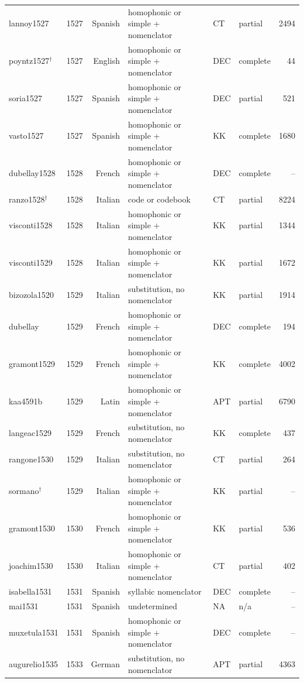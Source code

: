 {\begin{longtable}{@{}llrlllr@{}}
lannoy1527 & 1527 & Spanish & homophonic or simple + nomenclator & CT & partial & 2494 \\
poyntz1527$^\dagger$ & 1527 & English & homophonic or simple + nomenclator & DEC & complete & 44 \\
soria1527 & 1527 & Spanish & homophonic or simple + nomenclator & DEC & partial & 521 \\
vasto1527 & 1527 & Spanish & homophonic or simple + nomenclator & KK & complete & 1680 \\
dubellay1528 & 1528 & French & homophonic or simple + nomenclator & DEC & complete & -- \\
ranzo1528$^\dagger$ & 1528 & Italian & code or codebook & CT & partial & 8224 \\
visconti1528 & 1528 & Italian & homophonic or simple + nomenclator & KK & partial & 1344 \\
visconti1529 & 1528 & Italian & homophonic or simple + nomenclator & KK & partial & 1672 \\
bizozola1520 & 1529 & Italian & substitution, no nomenclator & KK & partial & 1914 \\
dubellay & 1529 & French & homophonic or simple + nomenclator & DEC & complete & 194 \\
gramont1529 & 1529 & French & homophonic or simple + nomenclator & KK & complete & 4002 \\
kaa4591b & 1529 & Latin & homophonic or simple + nomenclator & APT & partial & 6790 \\
langeac1529 & 1529 & French & substitution, no nomenclator & KK & complete & 437 \\
rangone1530 & 1529 & Italian & substitution, no nomenclator & CT & partial & 264 \\
sormano$^\dagger$ & 1529 & Italian & homophonic or simple + nomenclator & KK & partial & -- \\
gramont1530 & 1530 & French & homophonic or simple + nomenclator & KK & partial & 536 \\
joachim1530 & 1530 & Italian & homophonic or simple + nomenclator & CT & partial & 402 \\
isabella1531 & 1531 & Spanish & syllabic nomenclator & DEC & complete & -- \\
mai1531 & 1531 & Spanish & undetermined & NA & n/a & -- \\
muxetula1531 & 1531 & Spanish & homophonic or simple + nomenclator & DEC & complete & -- \\
augurelio1535 & 1533 & German & substitution, no nomenclator & APT & partial & 4363 \\

\end{longtable}}
